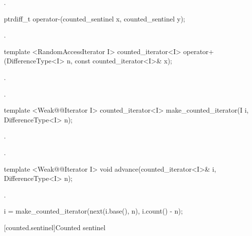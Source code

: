 \begin{addedblock}
\begin{itemdescr}
\pnum
\returns {}.
\end{itemdescr}

{
\color{oldclr}
\begin{itemdecl}
ptrdiff_t operator-(counted_sentinel x, counted_sentinel y);
\end{itemdecl}

\begin{itemdescr}
\pnum
\returns {}.
\end{itemdescr}
}

%
%
\begin{itemdecl}
template <RandomAccessIterator I>
  counted_iterator<I>
    operator+(DifferenceType<I> n, const counted_iterator<I>& x);
\end{itemdecl}

\begin{itemdescr}
\pnum
\requires {}.

\pnum
\returns {}.
\end{itemdescr}

%
\begin{itemdecl}
template <Weak@@Iterator I>
  counted_iterator<I> make_counted_iterator(I i, DifferenceType<I> n);
\end{itemdecl}

\begin{itemdescr}
\pnum
\requires {}.

\pnum
\returns {}.
\end{itemdescr}

%
\begin{itemdecl}
template <Weak@@Iterator I>
  void advance(counted_iterator<I>& i, DifferenceType<I> n);
\end{itemdecl}

\begin{itemdescr}
\pnum
\requires {}.

\pnum
\effects
\begin{codeblock}
i = make_counted_iterator(next(i.base(), n), i.count() - n);
\end{codeblock}
\end{itemdescr}

{
\color{oldclr}
[counted.sentinel]{Counted sentinel}

}
\end{addedblock}
